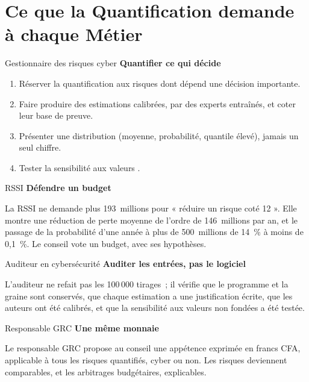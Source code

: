 \section{Ce que la Quantification demande à chaque Métier}
\label{sec:c05-metiers}

\begin{boxmetier}{Gestionnaire des risques cyber}
\textbf{Quantifier ce qui décide}
\begin{enumerate}
    \item Réserver la quantification aux risques dont dépend une décision
          importante.
    \item Faire produire des estimations calibrées, par des experts
          entraînés, et coter leur base de preuve.
    \item Présenter une distribution (moyenne, probabilité, quantile élevé),
          jamais un seul chiffre.
    \item Tester la sensibilité aux valeurs \NEK{}.
\end{enumerate}
\end{boxmetier}

\begin{boxmetier}{RSSI}
\textbf{Défendre un budget}

La RSSI ne demande plus 193~millions pour « réduire un risque coté 12 ».
Elle montre une réduction de perte moyenne de l'ordre de 146~millions par
an, et le passage de la probabilité d'une année à plus de 500~millions de
14~\% à moins de 0,1~\%. Le conseil vote un budget, avec ses hypothèses.
\end{boxmetier}

\begin{boxmetier}{Auditeur en cybersécurité}
\textbf{Auditer les entrées, pas le logiciel}

L'auditeur ne refait pas les 100\,000 tirages~; il vérifie que le programme
et la graine sont conservés, que chaque estimation a une justification
écrite, que les auteurs ont été calibrés, et que la sensibilité aux
valeurs non fondées a été testée.
\end{boxmetier}

\begin{boxmetier}{Responsable GRC}
\textbf{Une même monnaie}

Le responsable GRC propose au conseil une appétence exprimée en francs
CFA, applicable à tous les risques quantifiés, cyber ou non. Les risques
deviennent comparables, et les arbitrages budgétaires, explicables.
\end{boxmetier}

